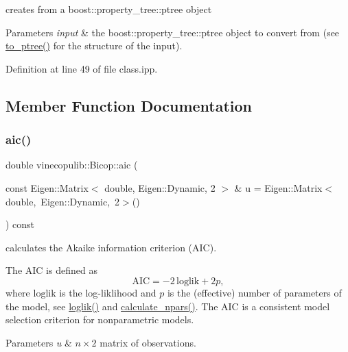creates from a boost\+::property\+\_\+tree\+::ptree object 


\begin{DoxyParams}{Parameters}
{\em input} & the boost\+::property\+\_\+tree\+::ptree object to convert from (see \hyperlink{classvinecopulib_1_1_bicop_a74397cf5f843f5aebb436a49322dd2f9}{to\+\_\+ptree()} for the structure of the input). \\
\hline
\end{DoxyParams}


Definition at line 49 of file class.\+ipp.



\subsection{Member Function Documentation}
\mbox{\label{classvinecopulib_1_1_bicop_a6d5907e8fcc38c3be57712a26b562a39}} 
\subsubsection{\texorpdfstring{aic()}{aic()}}
{\footnotesize\ttfamily double vinecopulib\+::\+Bicop\+::aic (\begin{DoxyParamCaption}\item[{const Eigen\+::\+Matrix$<$ double, Eigen\+::\+Dynamic, 2 $>$ \&}]{u = {\ttfamily Eigen\+:\+:Matrix$<$double,~Eigen\+:\+:Dynamic,~2$>$()} }\end{DoxyParamCaption}) const\hspace{0.3cm}{\ttfamily [inline]}}



calculates the Akaike information criterion (A\+IC). 

The A\+IC is defined as \[ \mathrm{AIC} = -2\, \mathrm{loglik} + 2 p, \] where $ \mathrm{loglik} $ is the log-\/liklihood and $ p $ is the (effective) number of parameters of the model, see \hyperlink{classvinecopulib_1_1_bicop_a81979ae3578ec9af1f5f956751faa63d}{loglik()} and \hyperlink{classvinecopulib_1_1_bicop_a8e6b3e3dd484d07cafeb24ca3393f5f0}{calculate\+\_\+npars()}. The A\+IC is a consistent model selection criterion for nonparametric models.


\begin{DoxyParams}{Parameters}
{\em u} & $n \times 2$ matrix of observations. \\
\hline
\end{DoxyParams}


